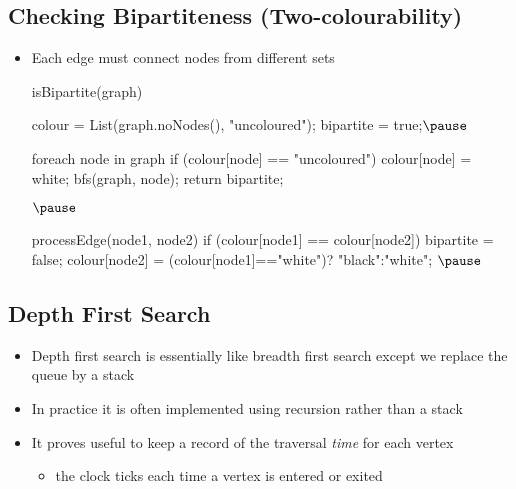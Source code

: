 
\begin{slide}
\section[-2]{Checking Bipartiteness (Two-colourability)}

\begin{PauseHighLight}
  \begin{itemize}
  \item Each edge must connect nodes from different sets\pause
    \begin{java}
    isBipartite(graph) {
       colour = List(graph.noNodes(), "uncoloured");
       bipartite = true;$\pause$

       foreach node in graph {
          if (colour[node] == "uncoloured") {
             colour[node] = white;
             bfs(graph, node);
          }
       }
       return bipartite;
    }$\pause$

    processEdge(node1, node2) {
       if (colour[node1] == colour[node2])
           bipartite = false;
       colour[node2] = (colour[node1]=="white")? "black":"white";
    }$\pause$
    \end{java}
  \end{itemize}
\end{PauseHighLight}

\end{slide}

\Outline %

\begin{slide}
\section{Depth First Search}

\begin{PauseHighLight}
  \begin{itemize}
  \item Depth first search is essentially like breadth first search
    except we replace the queue by a stack\pause
  \item In practice it is often implemented using recursion rather than
    a stack\pause
  \item It proves useful to keep a record of the traversal \emph{time}
    for each vertex
    \begin{itemize}
    \item the clock ticks each time a vertex is entered or exited\pause
    \end{itemize}
  \end{itemize}
\end{PauseHighLight}


\end{slide}

